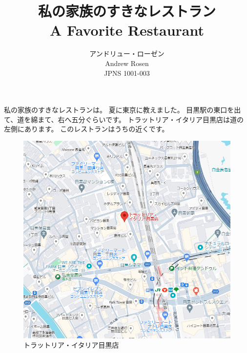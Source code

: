 \documentclass[12pt,a4paper]{article}
\title{私の家族のすきなレストラン\\\small{A Favorite Restaurant}}
\author{アンドリュー・ローゼン\\ \small{Andrew Rosen}\\\small{JPNS 1001-003}}
\date{}
\begin{document}
	\maketitle
	
	
	
	
	私の家族のすきなレストランは。
	夏に東京に教えました。
	目黒駅の東口を出て、道を綿まて、右へ五分ぐらいです。
	トラットリア・イタリア目黒店は道の左側にあります。
	このレストランはうちの近くです。%
	\begin{figure}
		\centering
		\includegraphics[width=0.7\linewidth]{restaurant}
		\caption{トラットリア・イタリア目黒店}
		\label{fig:restaurant}
	\end{figure}
	
\end{document}
